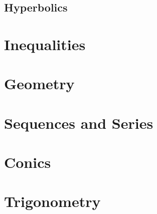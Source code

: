 \documentclass[a4paper,11pt]{book}
\begin{document}
\section{Hyperbolics}
\chapter{Inequalities}
\chapter{Geometry}
\chapter{Sequences and Series}
\chapter{Conics}
\chapter{Trigonometry}
\end{document}
